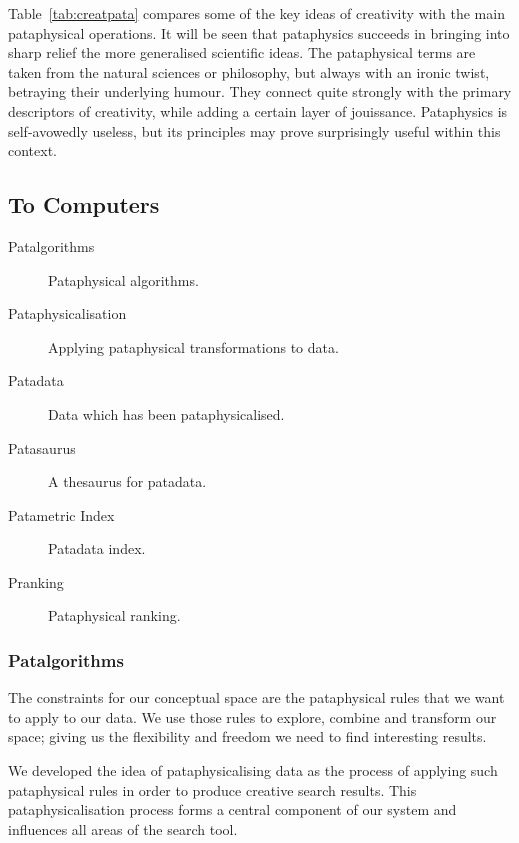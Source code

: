 \begin{leftbar}
Table~\ref{tab:creatpata} compares some of the key ideas of creativity \autocite{Boden2003, Indurkhya, Koestler1964} with the main pataphysical operations. It will be seen that pataphysics succeeds in bringing into sharp relief the more generalised scientific ideas. The pataphysical terms are taken from the natural sciences or philosophy, but always with an ironic twist, betraying their underlying humour. They connect quite strongly with the primary descriptors of creativity, while adding a certain layer of jouissance. Pataphysics is self-avowedly useless, but its principles may prove surprisingly useful within this context.
\end{leftbar}


\subsection{To Computers}

\begin{description}
  \item [Patalgorithms] Pataphysical algorithms.
  \item [Pataphysicalisation] Applying pataphysical transformations to data.
  \item [Patadata] Data which has been pataphysicalised.
  \item [Patasaurus] A thesaurus for patadata.
  \item [Patametric Index] Patadata index.
  \item [Pranking] Pataphysical ranking.
\end{description}


\subsubsection{Patalgorithms}

\begin{draft}
  The constraints for our conceptual space are the pataphysical rules that we want to apply to our data. We use those rules to explore, combine and transform our space; giving us the flexibility and freedom we need to find interesting results.

  We developed the idea of pataphysicalising data as the process of applying such pataphysical rules in order to produce creative search results. This pataphysicalisation process forms a central component of our system and influences all areas of the search tool.
\end{draft}

